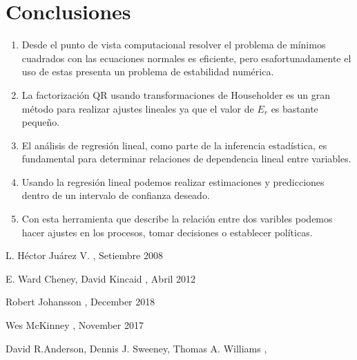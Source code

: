 \documentclass[twocolumn,twoside]{article}
\begin{document}
\section{Conclusiones}
\begin{enumerate}
  \item Desde el punto de vista computacional resolver el problema de m\'inimos cuadrados con las
        ecuaciones normales es eficiente, pero esafortunadamente el uso de estas presenta un problema
        de estabilidad num\'erica.

  \item La factorizaci\'on QR usando transformaciones de Householder es un
        gran m\'etodo para realizar ajustes lineales ya que el valor de $E_r$ es bastante peque\~no.

      
  \item El an\'alisis de regresi\'on lineal, como parte de la inferencia estad\'istica, 
  es fundamental para  determinar relaciones de dependencia lineal entre
  variables.
  \item Usando la regresi\'on lineal podemos realizar estimaciones y predicciones dentro de un intervalo
  de confianza deseado.

  \item Con esta herramienta que describe la relaci\'on entre dos varibles podemos hacer ajustes en los
        procesos, tomar decisiones o establecer pol\'iticas.
\end{enumerate}

\begin{thebibliography}{1}

   L. H\'ector Ju\'arez V.
  ,
  \newblock Setiembre 2008
  
   E. Ward Cheney, David Kincaid
  ,
  \newblock Abril 2012

   Robert Johansson
  ,
  \newblock December 2018


   Wes McKinney
  ,
  \newblock November 2017

   David R.Anderson, Dennis J. Sweeney, Thomas A. Williams
  ,



  
\end{thebibliography}
\end{document}
